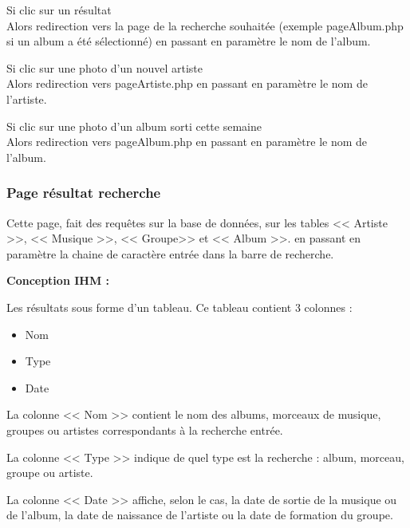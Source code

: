 			\begin{paragraphe}
				Si clic sur un résultat \\
				Alors redirection vers la page de la recherche souhaitée (exemple pageAlbum.php si un album a été sélectionné) en passant en paramètre le nom de l'album.
			\end{paragraphe}

			\begin{paragraphe}
				Si clic sur une photo d'un nouvel artiste \\
				Alors redirection vers pageArtiste.php en passant en paramètre le nom de l'artiste.
			\end{paragraphe}

			\begin{paragraphe}
				Si clic sur une photo d'un album sorti cette semaine \\
				Alors redirection vers pageAlbum.php en passant en paramètre le nom de l'album.
			\end{paragraphe}

		\subsubsection{Page résultat recherche}

			\begin{paragraphe}
				Cette page, fait des requêtes sur la base de données, sur les tables << Artiste >>, << Musique >>, << Groupe>> et << Album >>. en passant en paramètre la chaine de caractère entrée dans la barre de recherche.
			\end{paragraphe}

			\begin{paragraphe}
				\textbf{Conception IHM :}
			\end{paragraphe}

			\begin{paragraphe}
				Les résultats sous forme d'un tableau. Ce tableau contient 3 colonnes :
				\begin{itemize}
					\item Nom
					\item Type
					\item Date
				\end{itemize}
				La colonne << Nom >> contient le nom des albums, morceaux de musique, groupes ou artistes correspondants à la recherche entrée.\par
				La colonne << Type >> indique de quel type est la recherche : album, morceau, groupe ou artiste.\par
				La colonne << Date >> affiche, selon le cas, la date de sortie de la musique ou de l'album, la date de naissance de l'artiste ou la date de formation du groupe.
			\end{paragraphe}

